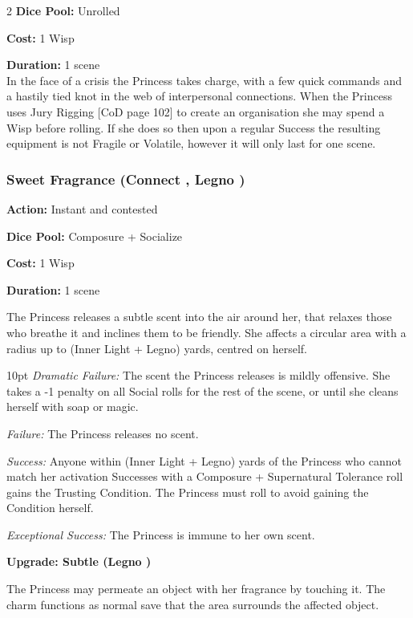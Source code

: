 \begin{multicols}{2}
\noindent \textbf{Dice Pool:} Unrolled

\noindent \textbf{Cost:} 1 Wisp

\noindent \textbf{Duration:} 1 scene \\

In the face of a crisis the Princess takes charge, with a few quick commands and a hastily tied knot in the web of interpersonal connections. When the Princess uses Jury Rigging [CoD page 102] to create an organisation she may spend a Wisp before rolling. If she does so then upon a regular Success the resulting equipment is not Fragile or Volatile, however it will only last for one scene. 

\subsubsection*{Sweet Fragrance (Connect \textbullet, Legno \textbullet)}

\noindent \textbf{Action:} Instant and contested

\noindent \textbf{Dice Pool:} Composure + Socialize

\noindent \textbf{Cost:} 1 Wisp

\noindent \textbf{Duration:} 1 scene

The Princess releases a subtle scent into the air around her, that relaxes those who breathe it and inclines them to be friendly. She affects a circular area with a radius up to (Inner Light + Legno) yards, centred on
herself.

\begin{myindentpar}{10pt}    \emph{Dramatic Failure:} The scent the Princess releases is mildly offensive. She takes a -1 penalty on all Social rolls for the rest of the scene, or until she cleans herself with soap or magic.

    \emph{Failure:} The Princess releases no scent. 

    \emph{Success:} Anyone within (Inner Light + Legno) yards of the Princess who cannot match her activation Successes with a  Composure + Supernatural Tolerance roll gains the Trusting Condition. The Princess must roll to avoid gaining the Condition herself.

    \emph{Exceptional Success:} The Princess is immune to her own scent.
	
	\textbf{Upgrade: Subtle (Legno \textbullet\textbullet)}

	The Princess may permeate an object with her fragrance by touching it. The charm functions as normal save that the area surrounds the affected object.\end{myindentpar}


\end{multicols}
